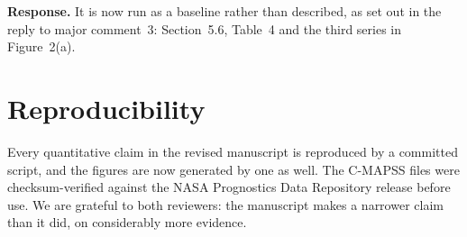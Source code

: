 \documentclass[11pt,a4paper]{article}
\begin{document}
\noindent\textbf{Response.} It is now run as a baseline rather than described, as set out in the
reply to major comment~3: Section~5.6, Table~4 and the third series in Figure~2(a).

\section*{Reproducibility}

Every quantitative claim in the revised manuscript is reproduced by a committed script, and the
figures are now generated by one as well. The C-MAPSS files were checksum-verified against the NASA
Prognostics Data Repository release before use. We are grateful to both reviewers: the manuscript
makes a narrower claim than it did, on considerably more evidence.
\end{document}
